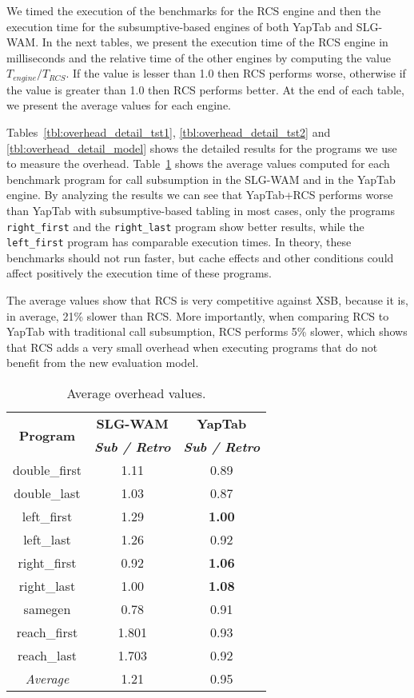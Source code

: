 We timed the execution of the benchmarks for the RCS engine and then the execution time
for the subsumptive-based engines of both YapTab and SLG-WAM. In the next tables,
we present the execution time of the RCS engine in milliseconds and the relative time
of the other engines by computing the value $T_{engine} / T_{RCS}$.
If the value is lesser than 1.0 then RCS performs worse, otherwise if the value is greater than
1.0 then RCS performs better. At the end of each table, we present the average values for
each engine.

Tables~\ref{tbl:overhead_detail_tst1}, \ref{tbl:overhead_detail_tst2} and \ref{tbl:overhead_detail_model}
shows the detailed results for the programs we use to measure the overhead.
Table~\ref{tbl:overhead_overview} shows the average values computed for each benchmark program
for call subsumption in the SLG-WAM and in the YapTab engine.
By analyzing the results we can see that YapTab+RCS performs worse
than YapTab with subsumptive-based tabling in most cases, only the
programs \texttt{right\_first} and the \texttt{right\_last} program show better results,
while the \texttt{left\_first} program has comparable execution times.
In theory, these benchmarks should not run faster, but cache effects and other
conditions could affect positively the execution time of these programs.

The average values show that
RCS is very competitive against XSB, because it is, in average, 21\% slower than RCS. More
importantly, when comparing RCS to YapTab with traditional call subsumption, RCS performs 5\% slower,
which shows that RCS adds a very small overhead when executing programs that do not benefit from the
new evaluation model.

\begin{table}[ht]
\centering
  \begin{tabular}{ccc}
   \hline
    \hline
    \multirow{2}{*}{\textbf{Program}} & \textbf{SLG-WAM} & \textbf{YapTab} \\
    & \textbf{\textit{\small{Sub / Retro}}} & \textbf{\textit{\small{Sub / Retro}}} \\
   \hline
   \hline
double\_first & 1.11 & 0.89 \\
double\_last & 1.03 & 0.87 \\
left\_first & 1.29 & \textbf{1.00} \\
left\_last &  1.26  & 0.92 \\
right\_first & 0.92 & \textbf{1.06} \\
right\_last & 1.00 & \textbf{1.08} \\
samegen & 0.78 & 0.91 \\
reach\_first  &  1.801  & 0.93 \\
reach\_last  &  1.703  & 0.92 \\
\hline
\hline
\textit{Average} &  1.21 &  0.95 \\
\hline
\hline
\end{tabular}
\caption{Average overhead values.}
\label{tbl:overhead_overview}
\end{table}

